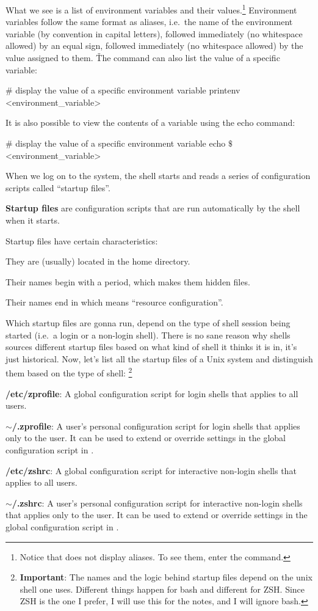 What we see is a list of environment variables and their values.\footnote{Notice that  does not
display aliases. To see them, enter the  command.} Environment variables follow the same format as
aliases, i.e.\ the name of the environment variable (by convention in capital letters), followed immediately (no
whitespace allowed) by an equal sign, followed immediately (no whitespace allowed) by the value assigned to them. \v

The  command can also list the value of a specific variable:
\begin{bash}
# display the value of a specific environment variable
printenv <environment_variable>
\end{bash}

It is also possible to view the contents of a variable using the echo command:
\begin{bash}
# display the value of a specific environment variable
echo $\$$<environment_variable>
\end{bash}

When we log on to the system, the shell starts and reads a series of configuration scripts called ``startup files''.

\textbf{Startup files} are configuration scripts that are run automatically by the shell when it starts.
\ed

Startup files have certain characteristics:
\bit
\item They are (usually) located in the home directory.
\item Their names begin with a period, which makes them hidden files.
\item Their names end in  which means ``resource configuration''.
\eit

Which startup files are gonna run, depend on the type of shell session being started (i.e.\ a login or a non-login
shell). There is no sane reason why shells sources different startup files based on what kind of shell it thinks it
is in, it's just historical. Now, let's list all the startup files of a Unix system and distinguish them based on the
type of shell: \footnote{\textbf{Important}: The names and the logic behind startup files depend on the unix shell
one uses. Different things happen for bash and different for ZSH. Since ZSH is the one I prefer, I will use this for
the notes, and I will ignore bash.}
\bit
\item \textbf{/etc/zprofile}: A global configuration script for login shells that applies to all users.
\item \textbf{$\sim$/.zprofile}: A user's personal configuration script for login shells that applies only to the user. It
can be used to extend or override settings in the global configuration script in .
\item \textbf{/etc/zshrc}: A global configuration script for interactive non-login shells that applies to all users.
\item \textbf{$\sim$/.zshrc}: A user's personal configuration script for interactive non-login shells that applies only to
the user. It can be used to extend or override settings in the global configuration script in .
\eit

